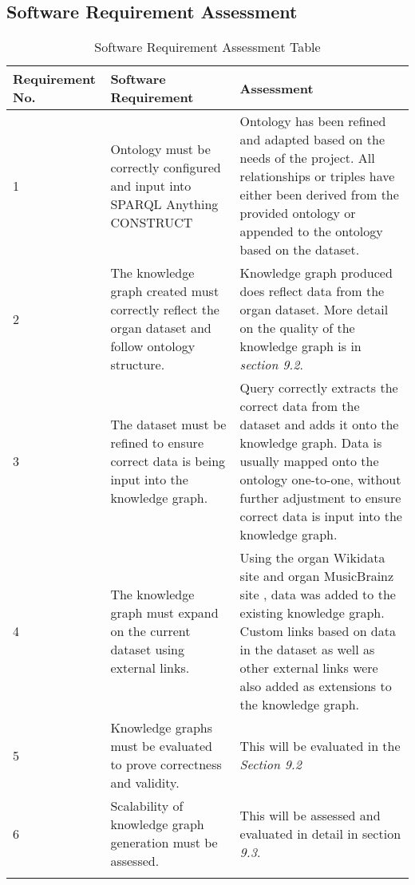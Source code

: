 \subsection{Software Requirement Assessment}
\begin{longtable}{|p{2.25cm}|p{5.5cm}|p{5.5cm}|}

\hline
\textbf{Requirement No.} & \textbf{Software Requirement} & \textbf{Assessment}\\
\hline

1& 
Ontology must be correctly configured and input into SPARQL Anything CONSTRUCT &
Ontology has been refined and adapted based on the needs of the project. All relationships or triples have either been derived from the provided ontology or appended to the ontology based on the dataset. \\
\hline

2&
The knowledge graph created must correctly reflect the organ dataset and follow ontology structure. &
Knowledge graph produced does reflect data from the organ dataset. More detail on the quality of the knowledge graph is in \textit{section 9.2}. \\
\hline

3&
The dataset must be refined to ensure correct data is being input into the knowledge graph. &
Query correctly extracts the correct data from the dataset and adds it onto the knowledge graph. Data is usually mapped onto the ontology one-to-one, without further adjustment to ensure correct data is input into the knowledge graph. \\
\hline

4&
The knowledge graph must expand on the current dataset using external links. &
Using the organ Wikidata site \cite{organwikidata} and organ MusicBrainz site \cite{organmusicbrainz}, data was added to the existing knowledge graph. Custom links based on data in the dataset as well as other external links were also added as extensions to the knowledge graph. \\
\hline

5&
Knowledge graphs must be evaluated to prove correctness and validity. &
This will be evaluated in the \textit{Section 9.2} \\ 
\hline

6&
Scalability of knowledge graph generation must be assessed. &
This will be assessed and evaluated in detail in section \textit{9.3}. \\ 
\hline
\caption{Software Requirement Assessment Table}
\end{longtable}

